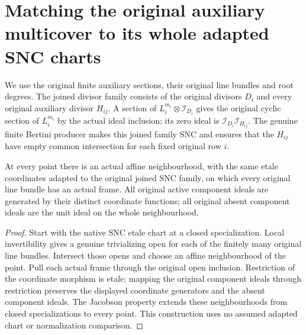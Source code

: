 \section{Matching the original auxiliary multicover to its whole adapted SNC charts}
\label{chap:kn-nadel-adapted-chart-matching}

We use the original finite auxiliary sections, their original line bundles and
root degrees.  The joined divisor family consists of the original divisors
$D_i$ and every original auxiliary divisor $H_{ij}$.  A section of
$L_i^{m_i}\otimes\mathcal I_{D_i}$ gives the original cyclic section of
$L_i^{m_i}$ by the actual ideal inclusion; its zero ideal is
$\mathcal I_{D_i}\mathcal I_{H_{ij}}$.  The genuine finite Bertini producer
makes this joined family SNC and ensures that the $H_{ij}$ have empty common
intersection for each fixed original row $i$.

\begin{lemma}
\label{lem:kn-adapted-common-frames}
\leanok
{}
At every point there is an actual affine neighbourhood, with the same
etale coordinates adapted to the original joined SNC family, on which every
original line bundle has an actual frame.  All original active component
ideals are generated by their distinct coordinate functions; all original
absent component ideals are the unit ideal on the whole neighbourhood.
\end{lemma}
\begin{proof}
Start with the native SNC etale chart at a closed specialization.  Local
invertibility gives a genuine trivializing open for each of the finitely many
original line bundles.  Intersect those opens and choose an affine
neighbourhood of the point.  Pull each actual frame through the original open
inclusion.  Restriction of the coordinate morphism is etale; mapping the
original component ideals through restriction preserves the displayed
coordinate generators and the absent component ideals.  The Jacobson property
extends these neighbourhoods from closed specializations to every point.
This construction uses no assumed adapted chart or normalization comparison.
\end{proof}

